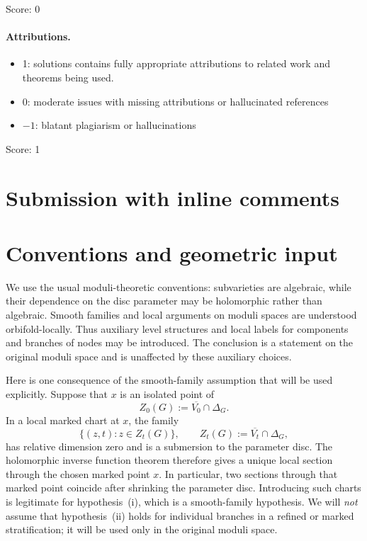 \documentclass[11pt]{article}
\newcommand{\ol}[1]{\overline{#1}}
\theoremstyle{remark}
\begin{document}
\noindent Score: 0

\paragraph{Attributions.}
\begin{itemize}
	\item  1: solutions contains fully appropriate attributions
		to related work and theorems being used.
	\item  0: moderate issues with missing attributions or hallucinated references
	\item  $-1$: blatant plagiarism or hallucinations
\end{itemize}

\noindent Score: 1

\newpage
\section{Submission with inline comments}


\begin{abstract}
We prove the asserted constancy using rigidity of Teichm\"uller curves
and the boundary structure theorem for totally geodesic subvarieties.
An important preliminary observation is that the compatibility
hypothesis forces every positive-dimensional boundary locus in a
stratum with at least two nodes to remain fixed set-theoretically.
This observation also handles the possibility that a cusp of one
boundary curve lies on another positive-dimensional boundary locus.
\end{abstract}

\section{Conventions and geometric input}

We use the usual moduli-theoretic conventions: subvarieties are
algebraic, while their dependence on the disc parameter may be
holomorphic rather than algebraic. Smooth families and local
arguments on moduli spaces are understood orbifold-locally.
Thus auxiliary level structures and local labels for components and
branches of nodes may be introduced. The conclusion is a statement
on the original moduli space and is unaffected by these auxiliary
choices.

Here is one consequence of the smooth-family assumption that will
be used explicitly. Suppose that \(x\) is an isolated point of
\[
Z_0(G):=\ol{V_0}\cap\Delta_G.
\]
In a local marked chart at \(x\), the family
\[
\{(z,t):z\in Z_t(G)\},\qquad
Z_t(G):=\ol{V_t}\cap\Delta_G,
\]
has relative dimension zero and is a submersion to the parameter
disc. The holomorphic inverse function theorem therefore gives
a unique local section through the chosen marked point \(x\).
In particular, two sections through that marked point coincide
after shrinking the parameter disc. Introducing such charts is
legitimate for hypothesis~(i), which is a smooth-family hypothesis.
We will \emph{not} assume that hypothesis~(ii) holds for individual
branches in a refined or marked stratification; it will be used
only in the original moduli space.
\end{document}
